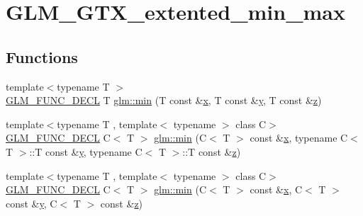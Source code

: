 \hypertarget{group__gtx__extended__min__max}{}\section{G\+L\+M\+\_\+\+G\+T\+X\+\_\+extented\+\_\+min\+\_\+max}
\label{group__gtx__extended__min__max}
\subsection*{Functions}
\begin{DoxyCompactItemize}
\item 
{\footnotesize template$<$typename T $>$ }\\\mbox{\hyperlink{setup_8hpp_ab2d052de21a70539923e9bcbf6e83a51}{G\+L\+M\+\_\+\+F\+U\+N\+C\+\_\+\+D\+E\+CL}} T \mbox{\hyperlink{group__gtx__extended__min__max_ga713d3f9b3e76312c0d314e0c8611a6a6}{glm\+::min}} (T const \&\mbox{\hyperlink{_s_d_l__opengl_8h_ad0e63d0edcdbd3d79554076bf309fd47}{x}}, T const \&\mbox{\hyperlink{_s_d_l__opengl_8h_a1675d9d7bb68e1657ff028643b4037e3}{y}}, T const \&\mbox{\hyperlink{_s_d_l__opengl__glext_8h_a5e74030ebb3297ce1b37ff716fedd68f}{z}})
\item 
{\footnotesize template$<$typename T , template$<$ typename $>$ class C$>$ }\\\mbox{\hyperlink{setup_8hpp_ab2d052de21a70539923e9bcbf6e83a51}{G\+L\+M\+\_\+\+F\+U\+N\+C\+\_\+\+D\+E\+CL}} C$<$ T $>$ \mbox{\hyperlink{group__gtx__extended__min__max_ga74d1a96e7cdbac40f6d35142d3bcbbd4}{glm\+::min}} (C$<$ T $>$ const \&\mbox{\hyperlink{_s_d_l__opengl_8h_ad0e63d0edcdbd3d79554076bf309fd47}{x}}, typename C$<$ T $>$\+::T const \&\mbox{\hyperlink{_s_d_l__opengl_8h_a1675d9d7bb68e1657ff028643b4037e3}{y}}, typename C$<$ T $>$\+::T const \&\mbox{\hyperlink{_s_d_l__opengl__glext_8h_a5e74030ebb3297ce1b37ff716fedd68f}{z}})
\item 
{\footnotesize template$<$typename T , template$<$ typename $>$ class C$>$ }\\\mbox{\hyperlink{setup_8hpp_ab2d052de21a70539923e9bcbf6e83a51}{G\+L\+M\+\_\+\+F\+U\+N\+C\+\_\+\+D\+E\+CL}} C$<$ T $>$ \mbox{\hyperlink{group__gtx__extended__min__max_ga42b5c3fc027fd3d9a50d2ccc9126d9f0}{glm\+::min}} (C$<$ T $>$ const \&\mbox{\hyperlink{_s_d_l__opengl_8h_ad0e63d0edcdbd3d79554076bf309fd47}{x}}, C$<$ T $>$ const \&\mbox{\hyperlink{_s_d_l__opengl_8h_a1675d9d7bb68e1657ff028643b4037e3}{y}}, C$<$ T $>$ const \&\mbox{\hyperlink{_s_d_l__opengl__glext_8h_a5e74030ebb3297ce1b37ff716fedd68f}{z}})

\end{DoxyCompactItemize}
